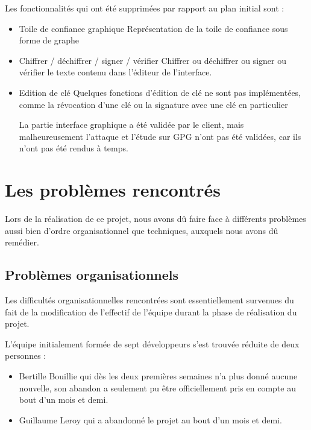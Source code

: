 \documentclass{../res/univ-projet}
\begin{document}
  

  Les fonctionnalités qui ont été supprimées par rapport au plan initial sont :\medbreak
  \begin{itemize}
  \item Toile de confiance graphique\smallbreak
  Représentation de la toile de confiance sous forme de graphe\smallbreak
  \item Chiffrer / déchiffrer / signer / vérifier \smallbreak
  Chiffrer ou déchiffrer ou signer ou vérifier le texte contenu dans l'éditeur de l'interface.\smallbreak
  \item Edition de clé \smallbreak
  Quelques fonctions d'édition de clé ne sont pas implémentées, comme la révocation d'une clé ou la signature avec une clé en particulier \smallbreak 
  

  La partie interface graphique a été validée par le client, mais malheureusement l'attaque et l'étude sur GPG n'ont pas été validées, car ils n'ont pas été rendus à temps.

  \end{itemize}

\section{Les problèmes rencontrés}

  Lors de la réalisation de ce projet, nous avons dû faire face à
  différents problèmes aussi bien d'ordre organisationnel que techniques,
  auxquels nous avons dû remédier.

  \subsection{Problèmes organisationnels}

    Les difficultés organisationnelles rencontrées sont essentiellement
    survenues du fait de la modification de l'effectif de l'équipe durant la
    phase de réalisation du projet. 

    L'équipe initialement formée de sept développeurs
    s'est trouvée réduite de deux personnes :
    \begin{itemize}
      \item Bertille Bouillie qui dès les deux premières semaines n'a plus donné
      aucune nouvelle, son abandon a seulement pu être officiellement pris en compte au bout d'un mois et demi.
      \item Guillaume Leroy qui a abandonné le projet au bout d'un mois et demi.
    \end{itemize}
\end{document}
